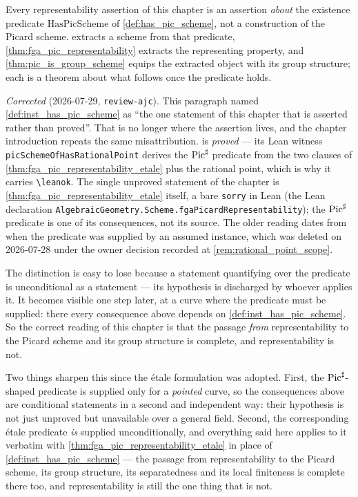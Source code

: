 \begin{remark}
  \label{rem:representability_is_conditional}
  Every representability assertion of this chapter is an assertion \emph{about} the
  existence predicate \(\mathrm{HasPicScheme}\) of \cref{def:has_pic_scheme}, not a
  construction of the Picard scheme.  extracts a scheme from that
  predicate, \cref{thm:fga_pic_representability} extracts the representing property, and
  \cref{thm:pic_is_group_scheme} equips the extracted object with its group structure; each
  is a theorem about what follows once the predicate holds.

  \emph{Corrected} (2026-07-29, \texttt{review-ajc}). This paragraph named
  \cref{def:inst_has_pic_scheme} as ``the one statement of this chapter that is asserted
  rather than proved''. That is no longer where the assertion lives, and the chapter
  introduction repeats the same misattribution.  is
  \emph{proved} --- its Lean witness \texttt{picSchemeOfHasRationalPoint} derives the
  \(\operatorname{Pic}^\sharp\) predicate from the two clauses of
  \cref{thm:fga_pic_representability_etale} plus the rational point, which is why it
  carries \texttt{\textbackslash leanok}. The single unproved statement of the chapter is
  \cref{thm:fga_pic_representability_etale} itself, a bare \texttt{sorry} in Lean
  (the Lean declaration \texttt{AlgebraicGeometry.Scheme.fgaPicardRepresentability});
  the \(\operatorname{Pic}^\sharp\) predicate is one of
  its consequences, not its source. The older reading dates from when the predicate was
  supplied by an assumed instance, which was deleted on 2026-07-28 under the owner decision
  recorded at \cref{rem:rational_point_scope}.

  The distinction is easy to lose because a statement quantifying over the predicate is
  unconditional as a statement --- its hypothesis is discharged by whoever applies it. It
  becomes visible one step later, at a curve where the predicate must be supplied: there
  every consequence above depends on \cref{def:inst_has_pic_scheme}. So the correct reading
  of this chapter is that the passage \emph{from} representability to the Picard scheme and
  its group structure is complete, and representability is not.

  Two things sharpen this since the \'etale formulation was adopted. First, the
  \(\operatorname{Pic}^\sharp\)-shaped predicate is supplied only for a \emph{pointed} curve, so the
  consequences above are conditional statements in a second and independent way: their
  hypothesis is not just unproved but unavailable over a general field. Second, the
  corresponding \'etale predicate \emph{is} supplied unconditionally, and everything said
  here applies to it verbatim with
  \cref{thm:fga_pic_representability_etale} in place of
  \cref{def:inst_has_pic_scheme} --- the passage from representability to the Picard
  scheme, its group structure, its separatedness and its local finiteness is complete
  there too, and representability is still the one thing that is not.
\end{remark}

